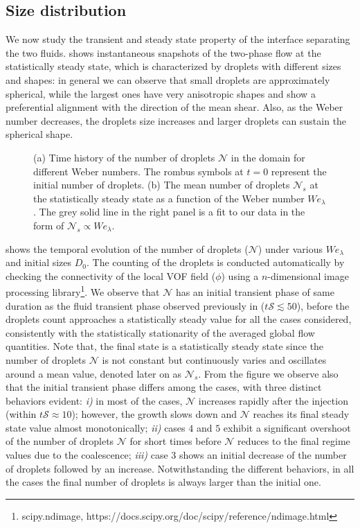 \subsection{Size distribution}
We now study the transient and steady state property of the interface separating the two fluids.  shows instantaneous snapshots of the two-phase flow at the statistically steady state, which is characterized by droplets with different sizes and shapes: in general we can observe that small droplets are approximately spherical, while the largest ones have very anisotropic shapes and show a preferential alignment with the direction of the mean shear. Also, as the Weber number decreases, the droplets size increases and larger droplets can sustain the spherical shape.

\begin{figure}
	\centering
	 \hspace{0.5cm}
	 \vspace{0.5cm}
	\caption{(a) Time history of the number of droplets $\mathcal{N}$ in the domain for different Weber numbers. The rombus symbols at $t=0$ represent the initial number of droplets. (b) The mean number of droplets $\mathcal{N}_s$ at the statistically steady state as a function of the Weber number $We_\lambda$. The grey solid line in the right panel is a fit to our data in the form of $\mathcal{N}_s \propto We_\lambda$.}
	\label{fig:count}
\end{figure}

 shows the temporal evolution of the number of droplets ($\mathcal{N}$) under various $We_\lambda$ and initial sizes $D_0$. The counting of the droplets is conducted automatically by checking the connectivity of the local VOF field ($\phi$) using a $n$-dimensional image processing library\footnote{scipy.ndimage, https://docs.scipy.org/doc/scipy/reference/ndimage.html}. We observe that $\mathcal{N}$ has an initial transient phase of same duration as the fluid transient phase observed previously in  ($t\mathcal{S} \lesssim 50$), before the droplets count approaches a statistically steady value for all the cases considered, consistently with the statistically stationarity of the averaged global flow quantities. Note that, the final state is a statistically steady state since the number of droplets $\mathcal{N}$ is not constant but continuously varies and oscillates around a mean value, denoted later on as $\mathcal{N}_s$. From the figure we observe also that the initial transient phase differs among the cases, with three distinct behaviors evident: \textit{i)} in most of the cases, $\mathcal{N}$ increases rapidly after the injection (within $t \mathcal{S} \approx 10$); however, the growth slows down and $\mathcal{N}$ reaches its final steady state value almost monotonically; \textit{ii)} cases $4$ and $5$ exhibit a significant overshoot of the number of droplets $\mathcal{N}$ for short times before $\mathcal{N}$ reduces to the final regime values due to the coalescence; \textit{iii)} case $3$ shows an initial decrease of the number of droplets followed by an increase. Notwithstanding the different behaviors, in all the cases the final number of droplets is always larger than the initial one. 

